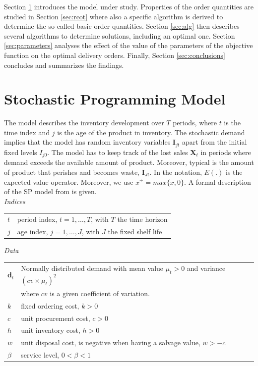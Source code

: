 Section \ref{sec:model} introduces the model under study. Properties of the order quantities are studied in Section \ref{sec:rcot} where also a specific algorithm is derived to determine the so-called basic order quantities. Section \ref{sec:alg} then describes several algorithms to determine solutions, including an optimal one. Section \ref{sec:parameters} analyses the effect of the value of the parameters of the objective function on the optimal delivery orders. Finally, Section \ref{sec:conclusions} concludes and summarizes the findings.



\section{Stochastic Programming Model}
\label{sec:model}

The model describes the inventory development over $T$ periods, where $t$ is the time index and $j$ is the age of the product in inventory. The stochastic demand implies that the model has random inventory variables $\boldsymbol{I}_{jt}$ apart from the initial fixed levels $I_{j0}$. The model has to keep track of the lost sales $\boldsymbol{X}_t$ in periods where demand exceeds the available amount of product. Moreover, typical is the amount of product that perishes and becomes waste, $\boldsymbol{I}_{Jt}$. In the notation, %
$E(.)$ is the expected value operator. Moreover,  we use $x^+=max\{x,0\}$. A formal description of the SP model from \cite{PAULS14} is given.\\

\smallskip\noindent\emph{Indices}\\
\begin{tabular}{ll}
$t$ & period index, $t=1,\ldots,T$, with $T$ the time horizon\\
$j$ & age index, $j=1,\ldots,J$, with $J$ the fixed shelf life\\
\end{tabular}


\smallskip\noindent\emph{Data}\\
\begin{tabular}{ll}
$\boldsymbol{d}_t$ &
Normally distributed demand with mean value $\mu_t>0$ and variance  $(cv\times \mu_t)^2$\\
& where $cv$ is a given coefficient of variation.\\
$k$ & fixed ordering cost, $k>0$\\
$c$ & unit procurement cost, $c>0$\\
$h$ & unit inventory cost, $h>0$\\
$w$ & unit disposal cost, is negative when having a salvage value, $w>-c$\\
$\beta$ & service level, $0<\beta<1$
\end{tabular}

